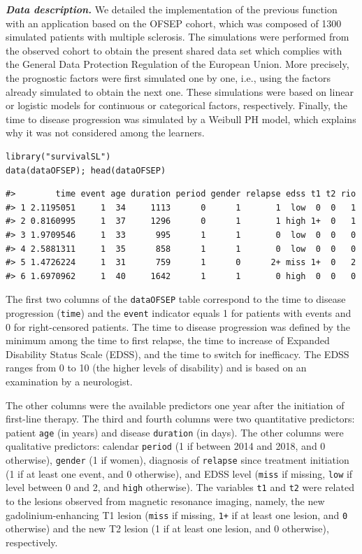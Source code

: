 \textbf{\textit{Data description.}} We detailed the implementation of the previous function with an application based on the OFSEP cohort, which was composed of 1300 simulated patients with multiple sclerosis. The simulations were performed from the observed cohort to obtain the present shared data set which complies with the General Data Protection Regulation of the European Union. More precisely, the prognostic factors were first simulated one by one, i.e., using the factors already simulated to obtain the next one. These simulations were based on linear or logistic models for continuous or categorical factors, respectively. Finally, the time to disease progression was simulated by a Weibull PH model, which explains why it was not considered among the learners.

\begin{verbatim}
library("survivalSL")
data(dataOFSEP); head(dataOFSEP)
\end{verbatim}

\begin{verbatim}
#>        time event age duration period gender relapse edss t1 t2 rio
#> 1 2.1195051     1  34     1113      0      1       1  low  0  0   1
#> 2 0.8160995     1  37     1296      0      1       1 high 1+  0   1
#> 3 1.9709546     1  33      995      1      1       0  low  0  0   0
#> 4 2.5881311     1  35      858      1      1       0  low  0  0   0
#> 5 1.4726224     1  31      759      1      0      2+ miss 1+  0   2
#> 6 1.6970962     1  40     1642      1      1       0 high  0  0   0
\end{verbatim}

The first two columns of the \texttt{dataOFSEP} table correspond to the time to disease progression (\texttt{time}) and the \texttt{event} indicator equals 1 for patients with events and 0 for right-censored patients. The time to disease progression was defined by the minimum among the time to first relapse, the time to increase of Expanded Disability Status Scale (EDSS), and the time to switch for inefficacy. The EDSS ranges from 0 to 10 (the higher levels of disability) and is based on an examination by a neurologist.

The other columns were the available predictors one year after the initiation of first-line therapy. The third and fourth columns were two quantitative predictors: patient \texttt{age} (in years) and disease \texttt{duration} (in days). The other columns were qualitative predictors: calendar \texttt{period} (1 if between 2014 and 2018, and 0 otherwise), \texttt{gender} (1 if women), diagnosis of \texttt{relapse} since treatment initiation (1 if at least one event, and 0 otherwise), and EDSS level (\texttt{miss} if missing, \texttt{low} if level between 0 and 2, and \texttt{high} otherwise). The variables \texttt{t1} and \texttt{t2} were related to the lesions observed from magnetic resonance imaging, namely, the new gadolinium-enhancing T1 lesion (\texttt{miss} if missing, \texttt{1+} if at least one lesion, and \texttt{0} otherwise) and the new T2 lesion (1 if at least one lesion, and 0 otherwise), respectively.

